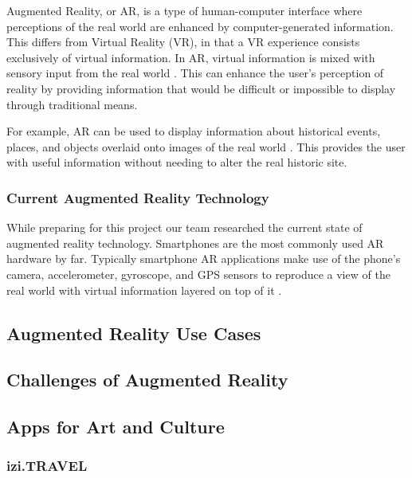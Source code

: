 \documentclass[a4paper, 10pt, american]{article}
\begin{document}
Augmented Reality, or AR, is a type of human-computer interface where
perceptions of the real world are enhanced by computer-generated information.
This differs from Virtual Reality (VR), in that a VR experience consists
exclusively of virtual information. In AR, virtual information is mixed with
sensory input from the real world \cite{carmigniani2011}. This can enhance the
user's perception of reality by providing information that would be difficult or
impossible to display through traditional means.

For example, AR can be used to display information about historical events,
places, and objects overlaid onto images of the real world \cite{saenz2009}.
This provides the user with useful information without needing to alter the real
historic site.

\subsubsection{Current Augmented Reality Technology}
\label{sec:currentAugmentedRealityTechnology}

While preparing for this project our team researched the current state of
augmented reality technology. Smartphones are the most commonly used AR hardware
by far. Typically smartphone AR applications make use of the phone's camera,
accelerometer, gyroscope, and GPS sensors to reproduce a view of the real world
with virtual information layered on top of it \cite{bonsor2018}.

\subsection{Augmented Reality Use Cases}
\label{sec:augmentedRealityUseCases}

\lipsum[1]

\subsection{Challenges of Augmented Reality}
\label{sec:challengesOfAugmentedReality}

\lipsum[1]

\subsection{Apps for Art and Culture}
\label{sec:appsForArtAndCulture}

\lipsum[2-3]

\subsubsection{izi.TRAVEL}
\label{sec:iziTravel}
\end{document}
